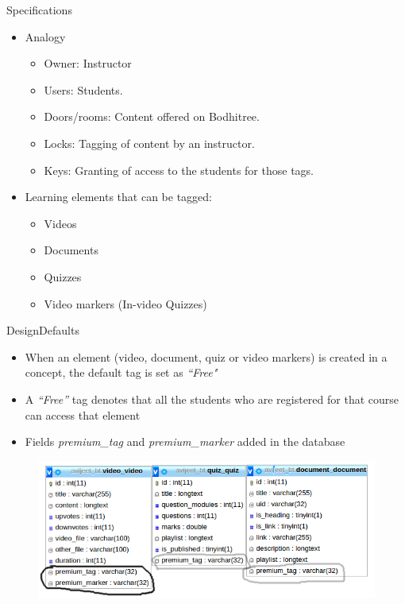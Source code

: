 \documentclass[xcolor=table]{beamer}
\begin{document}
\begin{frame}{Specifications}
	\begin{itemize}
		\item Analogy
		\begin{itemize}
			\item Owner: Instructor
			\item Users: Students.
			\item Doors/rooms: Content offered on Bodhitree.
			\item Locks: Tagging of content by an instructor.
			\item Keys: Granting of access to the students for those tags.
		\end{itemize}
		\item Learning elements that can be tagged:
		\begin{itemize}
			\item Videos
			\item Documents
			\item Quizzes
			\item Video markers (In-video Quizzes)
		\end{itemize}
	\end{itemize}
\end{frame}

\begin{frame}{Design}{Defaults}
	\begin{itemize}
		\item When an element (video, document, quiz or video markers) is created in a concept, the default tag is set as \textit{``Free"}
		\item A \textit{``Free''} tag denotes that all the students who are registered for that course can access that element
		\item Fields \textit{premium\_tag} and \textit{premium\_marker} added in the database
	\end{itemize}\vspace{-0.1in}
	\begin{figure}
	\centering
	\includegraphics[width=0.7\linewidth]{./media/premium_db1}
	\label{fig:premium_db1}
	\end{figure}
\end{frame}
\end{document}
